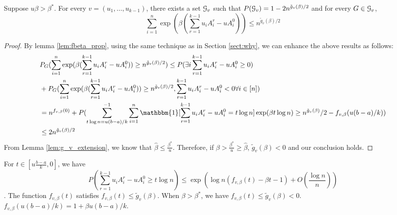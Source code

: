 \documentclass{article}
\begin{document}
\begin{lemma}\label{lem:large}
	Suppose $u\beta > \beta^*$. For every $v=(u_1, \dots, u_{k-1})$,
	there exists a set $\mathcal{G}_v$ such that $P(\mathcal{G}_v) = 1-2n^{\tilde{g}_v(\beta)/2}$ and for every $G\in \mathcal{G}_v$,
	\begin{equation}
	\sum_{i=1}^n \exp(\beta(\sum_{r=1}^{k-1}u_i A_i^r - u A_i^0)) \leq n^{\tilde{g}_v(\beta)/2}
	\end{equation}
\end{lemma}
\begin{proof}

	By lemma \ref{lem:fbeta_prop},
	using the same technique as in Section \ref{sect:why}, we can enhance the above results as follows:
	\begin{align*}
		&P_G(\sum_{i=1}^n \exp(\beta(\sum_{r=1}^{k-1}u_i A_i^r - u A_i^0)) \geq n^{\tilde{g}_v(\beta)/2})
		 \leq P(\exists i \sum_{r=1}^{k-1}u_i A_i^r - u A_i^0 \geq 0 ) \\
		&+ 
		P_G(\sum_{i=1}^n \exp(\beta(\sum_{r=1}^{k-1}u_i A_i^r - u A_i^0)) \geq n^{\tilde{g}_v(\beta)/2}, \sum_{r=1}^{k-1}u_i A_i^r - u A_i^0 < 0 \forall i \in [n])
		\\
		&= n^{f_{v,\beta}(0)} + P(\sum_{t\log n = u(b-a)/k}^{-1}\sum_{i=1}^n \mathbbm{1}[\sum_{r=1}^{k-1} u_iA_i^r -u A_i^0=t\log n]\exp(\beta t \log n) \geq n^{\tilde{g}_v(\beta)}/2 - f_{v,\beta}(u(b-a)/k)) \\
		&\leq 2n^{\tilde{g}_v(\beta)/2}
	\end{align*}
	From Lemma \ref{lem:g_v_extension}, we know that $\hat{\beta}\leq \frac{\beta^*}{u}$.
	Therefore, if $\beta > \frac{\beta^*}{u} \geq \hat{\beta}$, $\tilde{g}_v(\beta) < 0$ and our conclusion holds.
\end{proof}
\begin{lemma}\label{lem:fbeta_prop}
	For $ t \in [u\frac{b-a}{k}, 0] $,
	we have
	$$
	P(\sum_{r=1}^{k-1} u_i A_i^r - u A_i^0 \geq t \log n) \leq \exp(\log n (f_{v,\beta}(t) - \beta t - 1) + O(\frac{\log n}{n}))
	$$.
	The function $f_{v,\beta}(t)$ satisfies $f_{v, \beta}(t) \leq \tilde{g}_v(\beta)$.
	When $\beta > \beta^*$, we have $f_{v, \beta}(t) \leq \tilde{g}_v(\beta) < 0$.
	$f_{v,\beta}(u(b-a)/k) = 1 + \beta u (b-a)/k$.
\end{lemma}
\end{document}
